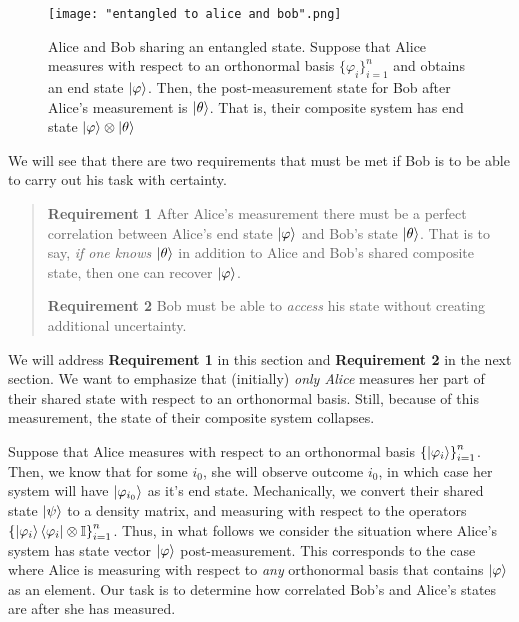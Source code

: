 \begin{figure}[h]
    \centering
    \texttt{[image: "entangled to alice and bob".png]}
    \caption{Alice and Bob sharing an entangled state. Suppose that Alice measures with respect to an orthonormal basis $\{\varphi_i\}_{i=1}^n$ and obtains an end state $\ket{\varphi}$.  Then, the post-measurement state for Bob after Alice's measurement is $\ket{\theta}$. That is, their composite system has end state $\ket{\varphi}\otimes\ket{\theta}$}
    \label{fig:entanglement}
\end{figure}


We will see that there are two requirements that must be met if Bob is to be able to carry out his task with certainty.

\begin{quote} 
    {\bf{Requirement 1}} After Alice's measurement there must be a perfect correlation between Alice's end state $\ket{\varphi}$ and Bob's state $\ket{\theta}$.  That is to say, {\emph{if one knows}} $\ket{\theta}$ in addition to Alice and Bob's shared composite state, then one can recover $\ket{\varphi}$.
    \medskip
    
    {\bf{Requirement 2}} Bob must be able to {\emph{access}} his state without creating additional uncertainty.
   
\end{quote}


We will address {\bf{Requirement 1}} in this section and {\bf{Requirement 2}} in the next section.  We want to emphasize that (initially) {\emph{only Alice}} measures her part of their shared state with respect to an orthonormal basis.  Still, because of this measurement, the state of their composite system collapses.  

Suppose that Alice measures with respect to an orthonormal basis ${\{\ket{\varphi_i}\}}_{i=1}^{n}$.  Then, we know that for some $i_0$, she will observe outcome $i_0$, in which case her system will have $\ket{\varphi_{i_0}}$ as it's end state. Mechanically, we 
convert their shared state $\ket{\psi}$ to a density matrix, and measuring with respect to the operators ${\{\ket{\varphi_i}\bra{\varphi_i}\otimes \mathbb{I} \}}_{i=1}^n$.  Thus, in what follows we consider the situation where Alice's system has state vector $\ket{\varphi}$ post-measurement.  This corresponds to the case where Alice is measuring with respect to {\emph{any}} orthonormal basis that contains $\ket{\varphi}$ as an element. Our task is to determine how correlated Bob's and Alice's states are after she has measured.  

